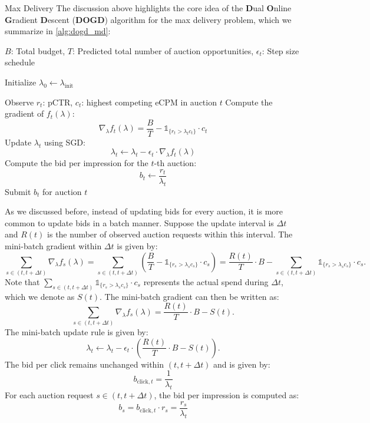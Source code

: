 \documentclass[../main.tex]{subfiles}
\begin{document}
\begin{section}{Max Delivery}
	The discussion above highlights the core idea of the \textbf{D}ual \textbf{O}nline \textbf{G}radient \textbf{D}escent (\textbf{DOGD}) algorithm for the max delivery problem, which we summarize in \autoref{alg:dogd_md}:
	
	
	
	\begin{algorithm}[H]
		\caption{\textbf{D}ual \textbf{O}nline \textbf{G}radient \textbf{D}escent(\textbf{DOGD}) for Max Delivery}
		\label{alg:dogd_md}
		\begin{algorithmic}[1]
			\Require $B$: Total budget, $T$:  Predicted total number of auction opportunities, $\epsilon_t$: Step size schedule
			
			\State Initialize $\lambda_0 \gets \lambda_{\text{init}}$ 
			
			 
			\State Observe  $r_t$: pCTR, $c_t$: highest competing eCPM in auction $t$
			\State Compute the gradient of $f_t(\lambda)$:
			\[
			\nabla_{\lambda} f_t(\lambda) = \frac{B}{T} - \mathds{1}_{ \{r_t > \lambda_t c_t\}} \cdot c_t
			\]
			\State Update $\lambda_t$ using SGD:
			\[
			\lambda_t \gets \lambda_t - \epsilon_t \cdot \nabla_{\lambda} f_t(\lambda)
			\]
			\State Compute the bid per impression for the $t$-th auction:
			\[
			b_t \gets \frac{r_t}{\lambda_t}
			\]
			\State Submit $b_t$ for auction $t$
			\EndFor
		\end{algorithmic}
	\end{algorithm}
	
	As we discussed before, instead of updating bids for every auction, it is more common to update bids in a batch manner. Suppose the update interval is \(\Delta t\) and \(R(t)\) is the number of observed auction requests within this interval. The mini-batch gradient within \(\Delta t\) is given by:
	\[
	\sum_{s \in (t, t+\Delta t)} \nabla_{\lambda} f_s(\lambda) = \sum_{s \in (t, t+\Delta t)} \left( \frac{B}{T} - \mathds{1}_{ \{r_s > \lambda_s c_s\}} \cdot c_s \right) = \frac{R(t)}{T} \cdot B - \sum_{s \in (t, t+\Delta t)} \mathds{1}_{ \{r_s > \lambda_s c_s\}} \cdot c_s.
	\]
	Note that \(\sum_{s \in (t, t+\Delta t)} \mathds{1}_{ \{r_s > \lambda_s c_s\}} \cdot c_s\) represents the actual spend during \(\Delta t\), which we denote as \(S(t)\). The mini-batch gradient can then be written as:
	\[
	\sum_{s \in (t, t+\Delta t)} \nabla_{\lambda} f_s(\lambda) = \frac{R(t)}{T} \cdot B - S(t).
	\]
	The mini-batch update rule is given by:
	\[
	\lambda_t \gets \lambda_t - \epsilon_t \cdot \left( \frac{R(t)}{T} \cdot B - S(t) \right).
	\]
	The bid per click remains unchanged within \((t, t+\Delta t)\) and is given by:
	\[
	b_{\text{click}, t} = \frac{1}{\lambda_t}
	\]
	For each auction request \(s \in (t, t+\Delta t)\), the bid per impression is computed as:
	\[
	b_s = b_{\text{click}, t} \cdot r_s = \frac{r_s}{\lambda_t}
	\]


\end{section}
\end{document}
